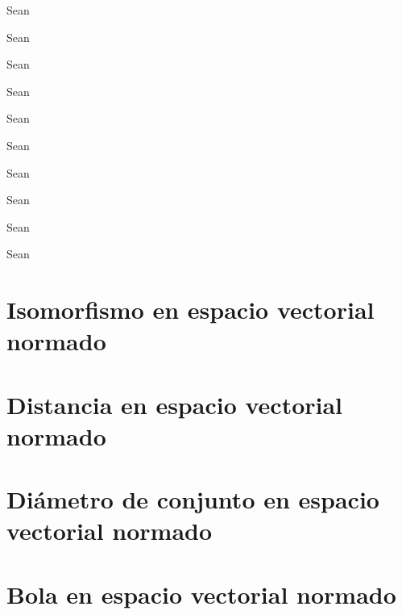\begin{prob}
    \label{prob11}
    Sean
\end{prob}

\begin{prob}
    \label{prob12}
    Sean
\end{prob}

\begin{prob}
    \label{prob13}
    Sean
\end{prob}

\begin{prob}
    \label{prob14}
    Sean
\end{prob}

\begin{prob}
    \label{prob15}
    Sean
\end{prob}

\begin{prob}
    \label{prob16}
    Sean
\end{prob}

\begin{prob}
    \label{prob17}
    Sean
\end{prob}

\begin{prob}
    \label{prob18}
    Sean
\end{prob}

\begin{prob}
    \label{prob19}
    Sean
\end{prob}

\begin{prob}
    \label{prob20}
    Sean
\end{prob}



\section{Isomorfismo en espacio vectorial normado}

\section{Distancia en espacio vectorial normado}

\section{Diámetro de conjunto en espacio vectorial normado}

\section{Bola en espacio vectorial normado}

